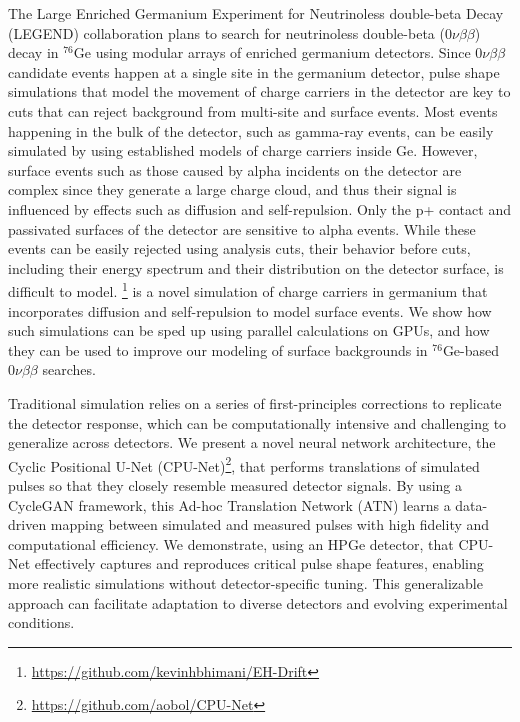 The Large Enriched Germanium Experiment for Neutrinoless double-beta Decay (LEGEND) collaboration plans to search for neutrinoless double-beta ($0\nu\beta\beta$) decay in ${}^{76}$Ge using modular arrays of enriched germanium detectors. Since $0\nu\beta\beta$ candidate events happen at a single site in the germanium detector, pulse shape simulations that model the movement of charge carriers in the detector are key to cuts that can reject background from multi-site and surface events. Most events happening in the bulk of the detector, such as gamma-ray events, can be easily simulated by using established models of charge carriers inside Ge. However, surface events such as those caused by alpha incidents on the detector are complex since they generate a large charge cloud, and thus their signal is influenced by effects such as diffusion and self-repulsion. Only the p+ contact and passivated surfaces of the detector are sensitive to alpha events. While these events can be easily rejected using analysis cuts, their behavior before cuts, including their energy spectrum and their distribution on the detector surface, is difficult to model. {\tdsim} \footnote{\url{https://github.com/kevinhbhimani/EH-Drift}} is a novel simulation of charge carriers in germanium that incorporates diffusion and self-repulsion to model surface events. We show how such simulations can be sped up using parallel calculations on GPUs, and how they can be used to improve our modeling of surface backgrounds in ${}^{76}$Ge-based $0\nu\beta\beta$ searches.

Traditional simulation relies on a series of first-principles corrections to replicate the detector response, which can be computationally intensive and challenging to generalize across detectors. We present a novel neural network architecture, the Cyclic Positional U-Net (CPU-Net)\footnote{\url{https://github.com/aobol/CPU-Net}}, that performs translations of simulated pulses so that they closely resemble measured detector signals. By using a CycleGAN framework, this Ad-hoc Translation Network (ATN) learns a data-driven mapping between simulated and measured pulses with high fidelity and computational efficiency. We demonstrate, using an HPGe detector, that CPU-Net effectively captures and reproduces critical pulse shape features, enabling more realistic simulations without detector-specific tuning. This generalizable approach can facilitate adaptation to diverse detectors and evolving experimental conditions.

\clearpage
